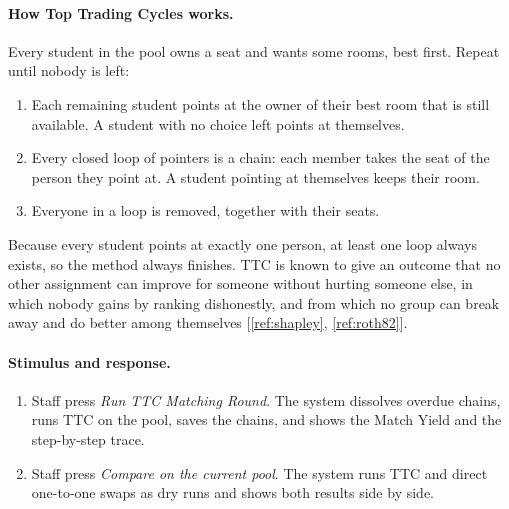 \documentclass[11pt,a4paper,parskip=half,toc=listof]{scrreprt}
\begin{document}
\paragraph{How Top Trading Cycles works.} Every student in the pool owns a
seat and wants some rooms, best first. Repeat until nobody is left:
\begin{enumerate}
  \item Each remaining student points at the owner of their best room that
    is still available. A student with no choice left points at
    themselves.
  \item Every closed loop of pointers is a chain: each member takes the
    seat of the person they point at. A student pointing at themselves
    keeps their room.
  \item Everyone in a loop is removed, together with their seats.
\end{enumerate}
Because every student points at exactly one person, at least one loop
always exists, so the method always finishes. TTC is known to give an
outcome that no other assignment can improve for someone without hurting
someone else, in which nobody gains by ranking dishonestly, and from which
no group can break away and do better among themselves
[\ref{ref:shapley}, \ref{ref:roth82}].

\paragraph{Stimulus and response.}
\begin{enumerate}
  \item Staff press \emph{Run TTC Matching Round}. The system dissolves
    overdue chains, runs TTC on the pool, saves the chains, and shows the
    Match Yield and the step-by-step trace.
  \item Staff press \emph{Compare on the current pool}. The system runs TTC
    and direct one-to-one swaps as dry runs and shows both results side by
    side.
\end{enumerate}
\end{document}
